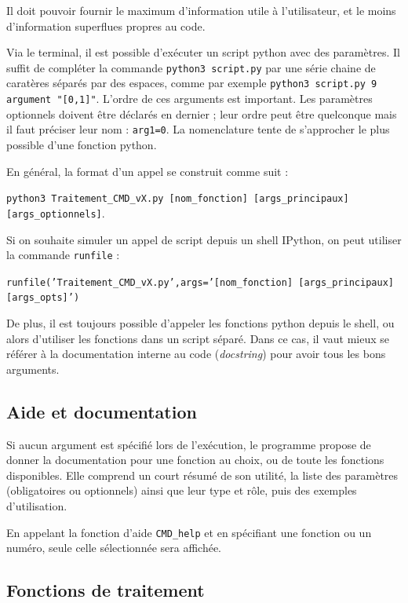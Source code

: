\documentclass[12pt]{article}
\begin{document}
    Il doit pouvoir fournir le maximum d'information utile à l'utilisateur, et le moins d'information superflues propres au code.

    Via le terminal, il est possible d'exécuter un script python avec des paramètres. Il suffit de compléter la commande \texttt{python3 script.py} par une série chaine de caratères séparés par des espaces, comme par exemple \texttt{python3 script.py 9 argument "[0,1]"}. L'ordre de ces arguments est important. Les paramètres optionnels doivent être déclarés en dernier ; leur ordre peut être quelconque mais il faut préciser leur nom : \texttt{arg1=0}. La nomenclature tente de s'approcher le plus possible d'une fonction python.

    En général, la format d'un appel se construit comme suit :
    
    \texttt{python3 Traitement\_CMD\_vX.py [nom\_fonction] [args\_principaux] [args\_optionnels]}.

    Si on souhaite simuler un appel de script depuis un shell IPython, on peut utiliser la commande \texttt{runfile} :
    
    \texttt{runfile('Traitement\_CMD\_vX.py',args='[nom\_fonction] [args\_principaux] [args\_opts]')}

    De plus, il est toujours possible d'appeler les fonctions python depuis le shell, ou alors d'utiliser les fonctions dans un script séparé. Dans ce cas, il vaut mieux se référer à la documentation interne au code (\textit{docstring}) pour avoir tous les bons arguments.

\subsection{Aide et documentation}

    Si aucun argument est spécifié lors de l'exécution, le programme propose de donner la documentation pour une fonction au choix, ou de toute les fonctions disponibles. Elle comprend un court résumé de son utilité, la liste des paramètres (obligatoires ou optionnels) ainsi que leur type et rôle, puis des exemples d'utilisation.

    En appelant la fonction d'aide \texttt{CMD\_help} et en spécifiant une fonction ou un numéro, seule celle sélectionnée sera affichée.

\subsection{Fonctions de traitement}
\end{document}

